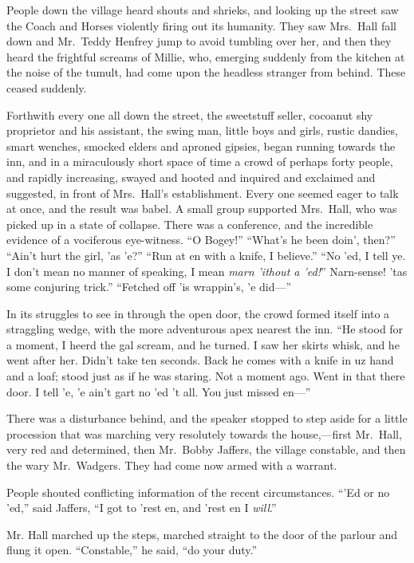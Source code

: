 People down the village heard shouts and shrieks, and looking up the street saw the Coach and Horses violently firing out its humanity. They saw Mrs.\ Hall fall down and Mr.\ Teddy Henfrey jump to avoid tumbling over her, and then they heard the frightful screams of Millie, who, emerging suddenly from the kitchen at the noise of the tumult, had come upon the headless stranger from behind. These ceased suddenly.

Forthwith every one all down the street, the sweetstuff seller, cocoanut shy proprietor and his assistant, the swing man, little boys and girls, rustic dandies, smart wenches, smocked elders and aproned gipsies, began running towards the inn, and in a miraculously short space of time a crowd of perhaps forty people, and rapidly increasing, swayed and hooted and inquired and exclaimed and suggested, in front of Mrs.\ Hall’s establishment. Every one seemed eager to talk at once, and the result was babel. A small group supported Mrs.\ Hall, who was picked up in a state of collapse. There was a conference, and the incredible evidence of a vociferous eye-witness. “O Bogey!” “What’s he been doin’, then?” “Ain’t hurt the girl, ’as ’e?” “Run at en with a knife, I believe.” “No ’ed, I tell ye. I don’t mean no manner of speaking, I mean \emph{marn ’ithout a ’ed!}” Narn-sense! ’tas some conjuring trick.” “Fetched off ’is wrappin’s, ’e did—”

In its struggles to see in through the open door, the crowd formed itself into a straggling wedge, with the more adventurous apex nearest the inn. “He stood for a moment, I heerd the gal scream, and he turned. I saw her skirts whisk, and he went after her. Didn’t take ten seconds. Back he comes with a knife in uz hand and a loaf; stood just as if he was staring. Not a moment ago. Went in that there door. I tell ’e, ’e ain’t gart no ’ed ’t all. You just missed en—”

There was a disturbance behind, and the speaker stopped to step aside for a little procession that was marching very resolutely towards the house,—first Mr.\ Hall, very red and determined, then Mr.\ Bobby Jaffers, the village constable, and then the wary Mr.\ Wadgers. They had come now armed with a warrant.

People shouted conflicting information of the recent circumstances. “\kern1pt’Ed or no ’ed,” said Jaffers, “I got to ’rest en, and ’rest en I \emph{will}.”

Mr. Hall marched up the steps, marched straight to the door of the parlour and flung it open. “Constable,” he said, “do your duty.”

